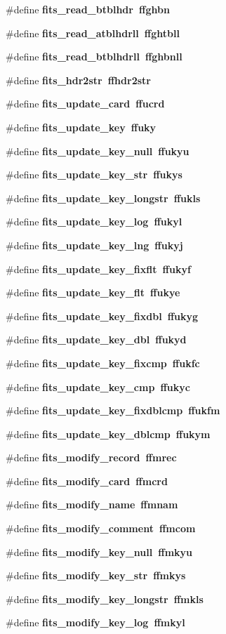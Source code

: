 \begin{CompactItemize}
\item 
\#define \bf{fits\_\-read\_\-btblhdr}~ffghbn
\item 
\#define \bf{fits\_\-read\_\-atblhdrll}~ffghtbll
\item 
\#define \bf{fits\_\-read\_\-btblhdrll}~ffghbnll
\item 
\#define \bf{fits\_\-hdr2str}~ffhdr2str
\item 
\#define \bf{fits\_\-update\_\-card}~ffucrd
\item 
\#define \bf{fits\_\-update\_\-key}~ffuky
\item 
\#define \bf{fits\_\-update\_\-key\_\-null}~ffukyu
\item 
\#define \bf{fits\_\-update\_\-key\_\-str}~ffukys
\item 
\#define \bf{fits\_\-update\_\-key\_\-longstr}~ffukls
\item 
\#define \bf{fits\_\-update\_\-key\_\-log}~ffukyl
\item 
\#define \bf{fits\_\-update\_\-key\_\-lng}~ffukyj
\item 
\#define \bf{fits\_\-update\_\-key\_\-fixflt}~ffukyf
\item 
\#define \bf{fits\_\-update\_\-key\_\-flt}~ffukye
\item 
\#define \bf{fits\_\-update\_\-key\_\-fixdbl}~ffukyg
\item 
\#define \bf{fits\_\-update\_\-key\_\-dbl}~ffukyd
\item 
\#define \bf{fits\_\-update\_\-key\_\-fixcmp}~ffukfc
\item 
\#define \bf{fits\_\-update\_\-key\_\-cmp}~ffukyc
\item 
\#define \bf{fits\_\-update\_\-key\_\-fixdblcmp}~ffukfm
\item 
\#define \bf{fits\_\-update\_\-key\_\-dblcmp}~ffukym
\item 
\#define \bf{fits\_\-modify\_\-record}~ffmrec
\item 
\#define \bf{fits\_\-modify\_\-card}~ffmcrd
\item 
\#define \bf{fits\_\-modify\_\-name}~ffmnam
\item 
\#define \bf{fits\_\-modify\_\-comment}~ffmcom
\item 
\#define \bf{fits\_\-modify\_\-key\_\-null}~ffmkyu
\item 
\#define \bf{fits\_\-modify\_\-key\_\-str}~ffmkys
\item 
\#define \bf{fits\_\-modify\_\-key\_\-longstr}~ffmkls
\item 
\#define \bf{fits\_\-modify\_\-key\_\-log}~ffmkyl
\item 

\end{CompactItemize}
